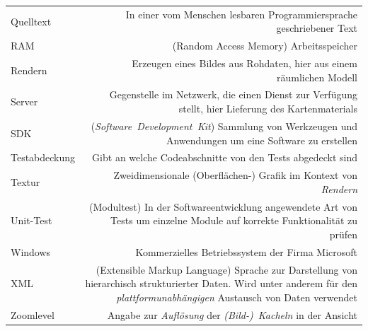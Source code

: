 \documentclass[10pt]{scrreprt}
\newcommand{\textref}[1]{\mbox{\raisebox{0.1ex}{\small$\rightarrow$ }\textit{#1}}}
\begin{document}
\begin{longtabu}{L{0.35} R{1.65}}
Quelltext & In einer vom Menschen lesbaren Programmiersprache geschriebener Text\\
RAM & (Random Access Memory) Arbeitsspeicher\\
Rendern & Erzeugen eines Bildes aus Rohdaten, hier aus einem räumlichen Modell\\
Server & Gegenstelle im Netzwerk, die einen Dienst zur Verfügung stellt, hier Lieferung des Kartenmaterials\\
SDK & (\textref{Software Development Kit}) Sammlung von Werkzeugen und Anwendungen um eine Software zu erstellen\\
Testabdeckung & Gibt an welche Codeabschnitte von den Tests abgedeckt sind\\
Textur & Zweidimensionale (Oberflächen-) Grafik im Kontext von \textref{Rendern}\\
Unit-Test & (Modultest) In der Softwareentwicklung angewendete Art von Tests um einzelne Module auf korrekte Funktionalität zu prüfen\\
Windows & Kommerzielles Betriebssystem der Firma Microsoft\\
XML & (Extensible Markup Language) Sprache zur Darstellung von hierarchisch strukturierter Daten. Wird unter anderem für den \textref{plattformunabhängigen} Austausch von Daten verwendet\\
Zoomlevel & Angabe zur \textref{Auflösung} der \textref{(Bild-) Kacheln} in der Ansicht\\
\end{longtabu}
\end{document}
